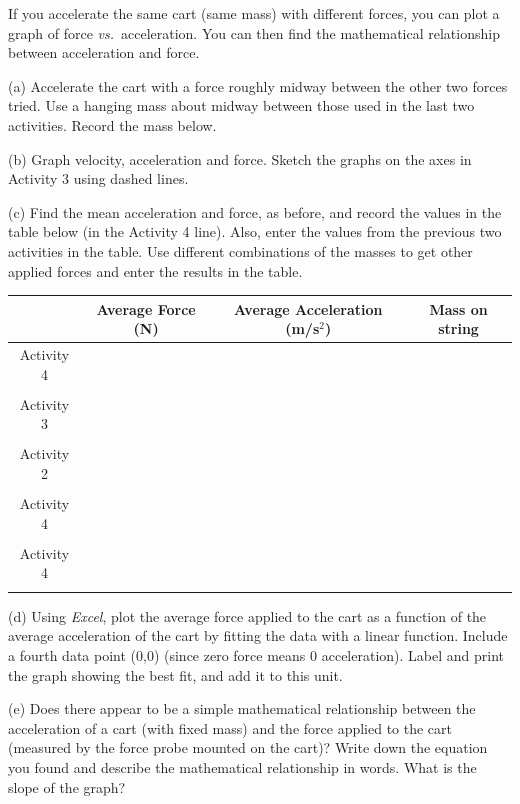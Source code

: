 If you accelerate the same cart (same mass) with different forces, you can 
plot a graph of force \textit{vs.}~acceleration.
You can then find the mathematical relationship between acceleration and force. 

(a) Accelerate the cart with a force roughly midway between the other two forces
tried. Use a hanging mass about midway between those used in the last two activities.
Record the mass below.
\answerspace{10mm}

(b) Graph velocity, acceleration and force. Sketch the graphs on the axes in
Activity 3 using dashed lines.

(c) Find the mean acceleration and force, as before, and record the values in
the table below (in the Activity 4 line). Also, enter the values from the previous 
two activities in the table.
Use different combinations of the
masses to get other applied forces and enter the results in the table. 

\vspace{0.3cm}
{\centering \begin{tabular}{|c|c|c|c|}
\hline 
&
Average Force (N)&
Average Acceleration (m/s\( ^{2} \)) &
Mass on string\\
\hline 
Activity 4&
&
&
\\
&
&
&
\\
\hline 
Activity 3&
&
&
\\
&
&
&
\\
\hline 
Activity 2&
&
&
\\
&
&
&
\\
\hline 
Activity 4&
&
&
\\
&
&
&
\\
\hline 
Activity 4&
&
&
\\
&
&
&
\\
\hline 
\end{tabular}\par}
\vspace{0.3cm}

(d) Using \textit{Excel}, plot the average force applied to the cart as a function of the average acceleration of the cart by fitting the data with a linear function. Include a fourth data point (0,0) (since zero force means 0 acceleration). Label and print the graph showing the best fit, and add it to this unit.

(e) Does there appear to be a simple mathematical relationship between the acceleration of a cart (with fixed mass) and the force applied to the cart (measured by the force probe mounted on the cart)? Write down the equation you found and describe the mathematical relationship in words.  What is the slope of the graph?
\answerspace{20mm}

